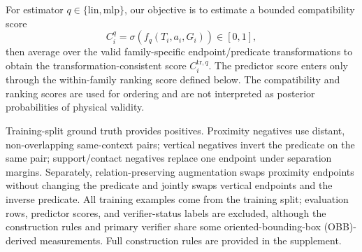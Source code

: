 For estimator $q\in\{\mathrm{lin},\mathrm{mlp}\}$, our objective is to estimate
a bounded compatibility score
\begin{equation}
C_i^q=\sigma\!\left(f_q(T_i,a_i,G_i)\right)\in[0,1],
\end{equation}
then average over the valid family-specific endpoint/predicate transformations
to obtain the transformation-consistent score $C_i^{\mathrm{tr},q}$. The
predictor score enters only through the within-family ranking score defined
below. The compatibility and ranking scores are used for ordering and are not
interpreted as posterior probabilities of physical validity.

Training-split ground truth provides positives. Proximity negatives use distant,
non-overlapping same-context pairs; vertical negatives invert the predicate on
the same pair; support/contact negatives replace one endpoint under separation
margins. Separately, relation-preserving augmentation swaps proximity endpoints
without changing the predicate and jointly swaps vertical endpoints and the
inverse predicate. All training examples come from the training split;
evaluation rows, predictor scores, and verifier-status labels are excluded,
although the construction rules and primary verifier share some
oriented-bounding-box (OBB)-derived measurements. Full construction rules are
provided in the supplement.
